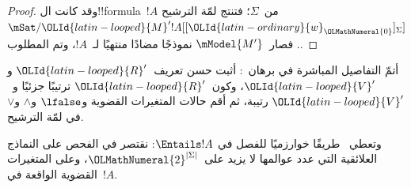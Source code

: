 \documentclass[../../../include/open-logic-section]{subfiles}
\begin{document}
\begin{proof}
  وقد كانت ال!!{formula}~$!A$ من~$\Sigma$؛ فتنتج لمّة الترشيح
  $\mSat/{{\OLId{latin-looped}{M}}'}{!A}[{[{\OLId{latin-ordinary}{w}}_{\OLMathNumeral{0}}]_\Sigma}]$. فصار~$\mModel{M'}$ نموذجًا
  مضادًا منتهيًا لـ~$!A$، وتم المطلوب.
\end{proof}

\begin{prob}
أتمّ التفاصيل المباشرة في برهان~:
أثبت حسن تعريف~${\OLId{latin-looped}{R}}'$ و${\OLId{latin-looped}{V}}'$، وكون~${\OLId{latin-looped}{R}}'$ ترتيبًا جزئيًا و~${\OLId{latin-looped}{V}}'$
رتيبة، ثم أقم حالات المتغيرات القضوية و$\lfalse$ و$\land$ و$\lor$ في
لمّة الترشيح.
\end{prob}

وتعطي~ طريقًا خوارزميًا للفصل في
$\Entails !A$: نقتصر في الفحص على النماذج العلائقية التي عدد عوالمها
لا يزيد على~${\OLMathNumeral{2}}^{|\Sigma|}$، وعلى المتغيرات القضوية الواقعة
في~$!A$.
\end{document}
